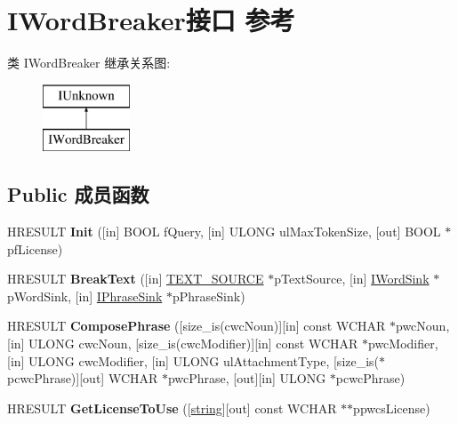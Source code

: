 \hypertarget{interface_i_word_breaker}{}\section{I\+Word\+Breaker接口 参考}
\label{interface_i_word_breaker}
类 I\+Word\+Breaker 继承关系图\+:\begin{figure}[H]
\begin{center}
\leavevmode
\includegraphics[height=2.000000cm]{interface_i_word_breaker}
\end{center}
\end{figure}
\subsection*{Public 成员函数}
\begin{DoxyCompactItemize}
\item 
\mbox{\label{interface_i_word_breaker_abaea1973064256d921bbb76fdabee308}} 
H\+R\+E\+S\+U\+LT {\bfseries Init} (\mbox{[}in\mbox{]} B\+O\+OL f\+Query, \mbox{[}in\mbox{]} U\+L\+O\+NG ul\+Max\+Token\+Size, \mbox{[}out\mbox{]} B\+O\+OL $\ast$pf\+License)
\item 
\mbox{\label{interface_i_word_breaker_ad50ffab5a5d2b14f23407a48ebb68e35}} 
H\+R\+E\+S\+U\+LT {\bfseries Break\+Text} (\mbox{[}in\mbox{]} \hyperlink{structtag_t_e_x_t___s_o_u_r_c_e}{T\+E\+X\+T\+\_\+\+S\+O\+U\+R\+CE} $\ast$p\+Text\+Source, \mbox{[}in\mbox{]} \hyperlink{interface_i_word_sink}{I\+Word\+Sink} $\ast$p\+Word\+Sink, \mbox{[}in\mbox{]} \hyperlink{interface_i_phrase_sink}{I\+Phrase\+Sink} $\ast$p\+Phrase\+Sink)
\item 
\mbox{\label{interface_i_word_breaker_a540da9d4ea072ee06efea6cb444f7c19}} 
H\+R\+E\+S\+U\+LT {\bfseries Compose\+Phrase} (\mbox{[}size\+\_\+is(cwc\+Noun)\mbox{]}\mbox{[}in\mbox{]} const W\+C\+H\+AR $\ast$pwc\+Noun, \mbox{[}in\mbox{]} U\+L\+O\+NG cwc\+Noun, \mbox{[}size\+\_\+is(cwc\+Modifier)\mbox{]}\mbox{[}in\mbox{]} const W\+C\+H\+AR $\ast$pwc\+Modifier, \mbox{[}in\mbox{]} U\+L\+O\+NG cwc\+Modifier, \mbox{[}in\mbox{]} U\+L\+O\+NG ul\+Attachment\+Type, \mbox{[}size\+\_\+is($\ast$pcwc\+Phrase)\mbox{]}\mbox{[}out\mbox{]} W\+C\+H\+AR $\ast$pwc\+Phrase, \mbox{[}out\mbox{]}\mbox{[}in\mbox{]} U\+L\+O\+NG $\ast$pcwc\+Phrase)
\item 
\mbox{\label{interface_i_word_breaker_aa3e25b2d9c7dc15a52248d0fe19aec25}} 
H\+R\+E\+S\+U\+LT {\bfseries Get\+License\+To\+Use} (\mbox{[}\hyperlink{structstring}{string}\mbox{]}\mbox{[}out\mbox{]} const W\+C\+H\+AR $\ast$$\ast$ppwcs\+License)
\end{DoxyCompactItemize}

